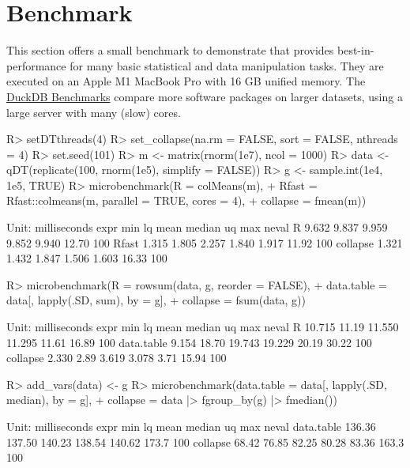 \documentclass[article]{jss}
\begin{document}
\section{Benchmark} \label{sec:bench}
%
This section offers a small benchmark to demonstrate that  provides best-in- performance for many basic statistical and data manipulation tasks. They are executed on an Apple M1 MacBook Pro with 16 GB unified memory. The \href{https://duckdblabs.github.io/db-benchmark/}{DuckDB Benchmarks} compare more software packages on larger datasets, using a large server with many (slow) cores.
%
\begin{Schunk}
\begin{Sinput}
R> setDTthreads(4)
R> set_collapse(na.rm = FALSE, sort = FALSE, nthreads = 4)
R> set.seed(101)
R> m <- matrix(rnorm(1e7), ncol = 1000)
R> data <- qDT(replicate(100, rnorm(1e5), simplify = FALSE))
R> g <- sample.int(1e4, 1e5, TRUE)
R> microbenchmark(R = colMeans(m),
+                 Rfast = Rfast::colmeans(m, parallel = TRUE, cores = 4),
+                 collapse = fmean(m))
\end{Sinput}
\begin{Soutput}
Unit: milliseconds
     expr   min    lq  mean median    uq   max neval
        R 9.632 9.837 9.959  9.852 9.940 12.70   100
    Rfast 1.315 1.805 2.257  1.840 1.917 11.92   100
 collapse 1.321 1.432 1.847  1.506 1.603 16.33   100
\end{Soutput}
\begin{Sinput}
R> microbenchmark(R = rowsum(data, g, reorder = FALSE),
+                 data.table = data[, lapply(.SD, sum), by = g],
+                 collapse = fsum(data, g))
\end{Sinput}
\begin{Soutput}
Unit: milliseconds
       expr    min    lq   mean median    uq   max neval
          R 10.715 11.19 11.550 11.295 11.61 16.89   100
 data.table  9.154 18.70 19.743 19.229 20.19 30.22   100
   collapse  2.330  2.89  3.619  3.078  3.71 15.94   100
\end{Soutput}
\begin{Sinput}
R> add_vars(data) <- g
R> microbenchmark(data.table = data[, lapply(.SD, median), by = g],
+                 collapse = data |> fgroup_by(g) |> fmedian())
\end{Sinput}
\begin{Soutput}
Unit: milliseconds
       expr    min     lq   mean median     uq   max neval
 data.table 136.36 137.50 140.23 138.54 140.62 173.7   100
   collapse  68.42  76.85  82.25  80.28  83.36 163.3   100

\end{Soutput}
\end{Schunk}
\end{document}
